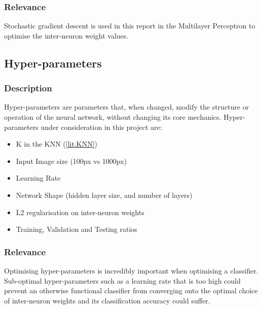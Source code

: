 \subsubsection{Relevance}
Stochastic gradient descent is used in this report in the Multilayer Perceptron to optimise the inter-neuron weight values. 

\subsection{Hyper-parameters}
\subsubsection{Description}
Hyper-parameters are parameters that, when changed, modify the structure or operation of the neural network, without changing its core mechanics. Hyper-parameters under consideration in this project are:
\begin{itemize}
	\item K in the KNN (\ref{lit:KNN})
	\item Input Image size (100px vs 1000px)
	\item Learning Rate
	\item Network Shape (hidden layer size, and number of layers)
	\item L2 regularisation on inter-neuron weights
	\item Training, Validation and Testing ratios
\end{itemize}
\subsubsection{Relevance}
Optimising hyper-parameters is incredibly important when optimising a classifier. Sub-optimal hyper-parameters such as a learning rate that is too high could prevent an otherwise functional classifier from converging onto the optimal choice of inter-neuron weights and its classification accuracy could suffer. 

